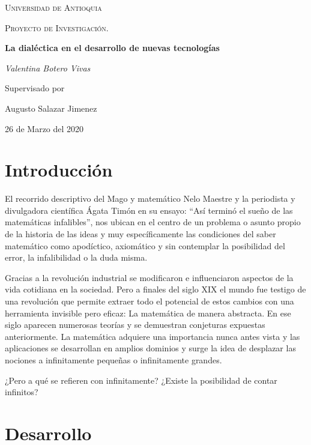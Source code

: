 \documentclass{report}   %
\begin{document}
\begin{titlepage}    %
	\centering
	{\scshape\LARGE Universidad de Antioquia \par}
	\vspace{1cm}
	{\scshape\Large Proyecto de Investigación.  \par}
	\vspace{1.5cm}
	{\huge\bfseries La dialéctica en el desarrollo de nuevas tecnologías\par}
	\vspace{2cm}
	{\Large\itshape Valentina Botero Vivas \par}
	\vfill
    Supervisado por\par
	Augusto Salazar Jimenez\textsc{}

	\vfill

	{\large 26 de Marzo del 2020 \par}
\end{titlepage}


\section{Introducción}

El recorrido descriptivo del Mago y matemático Nelo Maestre y la periodista y divulgadora científica Ágata Timón en su ensayo: “Así terminó el sueño de las matemáticas infalibles”, nos ubican en el centro de un problema o asunto propio de la historia de las ideas y muy específicamente las condiciones del saber matemático como apodíctico, axiomático y sin contemplar la posibilidad del error, la infalibilidad o la duda misma.  

Gracias a la revolución industrial se modificaron e influenciaron aspectos de la vida cotidiana en la sociedad. Pero a finales del siglo XIX el mundo fue testigo de una revolución que permite extraer todo el potencial de estos cambios con una herramienta invisible pero eficaz: La matemática de manera abstracta.
En ese siglo aparecen numerosas teorías y se demuestran conjeturas expuestas anteriormente. La matemática adquiere una importancia nunca antes vista y las aplicaciones se desarrollan en amplios dominios y surge la idea de desplazar las nociones a infinitamente pequeñas o infinitamente grandes.

¿Pero a qué se refieren con infinitamente? ¿Existe la posibilidad de contar infinitos?



\section{Desarrollo}
\end{document}
